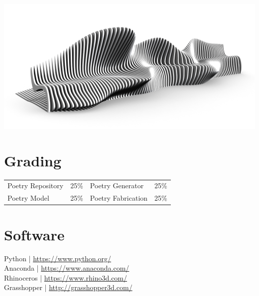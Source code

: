 \documentclass[11pt,article,oneside]{memoir}
\begin{document}
\includegraphics[width=\textwidth]{../images/parametric_bench/parametric_bench_2.png}


\section{Grading}
%
\begin{table}[H]
\begin{tabular}{l r @{\hskip 2.5cm} l r}
%
Poetry Repository & 25\% & 
Poetry Generator & 25\% \\
Poetry Model & 25\% &
Poetry Fabrication & 25\% \\
%
\end{tabular}
\end{table}

\clearpage

\section{Software}
\begin{multicols}{2}
\raggedright
Python | \url{https://www.python.org/}\\
Anaconda | \url{https://www.anaconda.com/}\\
Rhinoceros | \url{https://www.rhino3d.com/}\\
Grasshopper | \url{http://grasshopper3d.com/}\\
\end{multicols}
\end{document}
